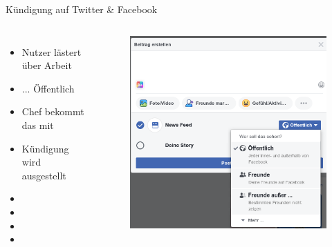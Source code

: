 \documentclass[10pt]{beamer}
\begin{document}
%
%
\begin{frame}[fragile]{Kündigung auf Twitter \& Facebook}
\begin{columns}[T,c,onlytextwidth]
  \begin{itemize}
    \item Nutzer lästert über Arbeit
    \item ... Öffentlich
    \item Chef bekommt das mit
    \item Kündigung wird ausgestellt
    \item[] 
    \item[] 
    \item[] 
    \item[] 
  \end{itemize}
	\begin{figure}
		\includegraphics[width=1\textwidth]{images/facebook}
	\end{figure}
\end{columns}
\end{frame}
\end{document}
